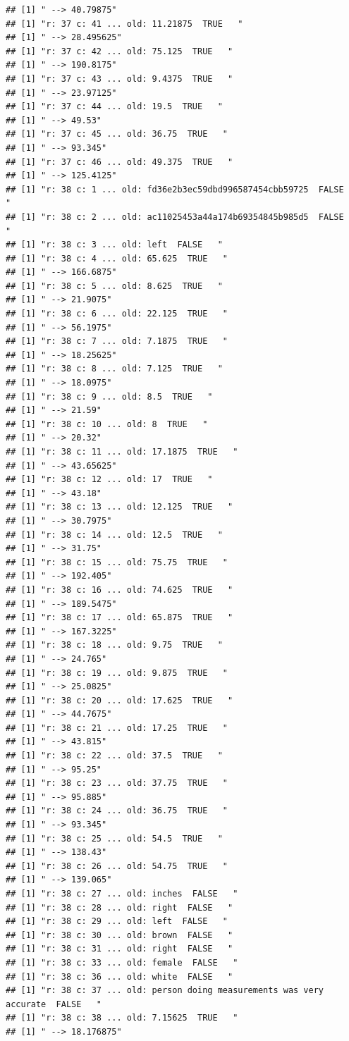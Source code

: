\documentclass[]{article}
\begin{document}
\begin{verbatim}
## [1] " --> 40.79875"
## [1] "r: 37 c: 41 ... old: 11.21875  TRUE   "
## [1] " --> 28.495625"
## [1] "r: 37 c: 42 ... old: 75.125  TRUE   "
## [1] " --> 190.8175"
## [1] "r: 37 c: 43 ... old: 9.4375  TRUE   "
## [1] " --> 23.97125"
## [1] "r: 37 c: 44 ... old: 19.5  TRUE   "
## [1] " --> 49.53"
## [1] "r: 37 c: 45 ... old: 36.75  TRUE   "
## [1] " --> 93.345"
## [1] "r: 37 c: 46 ... old: 49.375  TRUE   "
## [1] " --> 125.4125"
## [1] "r: 38 c: 1 ... old: fd36e2b3ec59dbd996587454cbb59725  FALSE   "
## [1] "r: 38 c: 2 ... old: ac11025453a44a174b69354845b985d5  FALSE   "
## [1] "r: 38 c: 3 ... old: left  FALSE   "
## [1] "r: 38 c: 4 ... old: 65.625  TRUE   "
## [1] " --> 166.6875"
## [1] "r: 38 c: 5 ... old: 8.625  TRUE   "
## [1] " --> 21.9075"
## [1] "r: 38 c: 6 ... old: 22.125  TRUE   "
## [1] " --> 56.1975"
## [1] "r: 38 c: 7 ... old: 7.1875  TRUE   "
## [1] " --> 18.25625"
## [1] "r: 38 c: 8 ... old: 7.125  TRUE   "
## [1] " --> 18.0975"
## [1] "r: 38 c: 9 ... old: 8.5  TRUE   "
## [1] " --> 21.59"
## [1] "r: 38 c: 10 ... old: 8  TRUE   "
## [1] " --> 20.32"
## [1] "r: 38 c: 11 ... old: 17.1875  TRUE   "
## [1] " --> 43.65625"
## [1] "r: 38 c: 12 ... old: 17  TRUE   "
## [1] " --> 43.18"
## [1] "r: 38 c: 13 ... old: 12.125  TRUE   "
## [1] " --> 30.7975"
## [1] "r: 38 c: 14 ... old: 12.5  TRUE   "
## [1] " --> 31.75"
## [1] "r: 38 c: 15 ... old: 75.75  TRUE   "
## [1] " --> 192.405"
## [1] "r: 38 c: 16 ... old: 74.625  TRUE   "
## [1] " --> 189.5475"
## [1] "r: 38 c: 17 ... old: 65.875  TRUE   "
## [1] " --> 167.3225"
## [1] "r: 38 c: 18 ... old: 9.75  TRUE   "
## [1] " --> 24.765"
## [1] "r: 38 c: 19 ... old: 9.875  TRUE   "
## [1] " --> 25.0825"
## [1] "r: 38 c: 20 ... old: 17.625  TRUE   "
## [1] " --> 44.7675"
## [1] "r: 38 c: 21 ... old: 17.25  TRUE   "
## [1] " --> 43.815"
## [1] "r: 38 c: 22 ... old: 37.5  TRUE   "
## [1] " --> 95.25"
## [1] "r: 38 c: 23 ... old: 37.75  TRUE   "
## [1] " --> 95.885"
## [1] "r: 38 c: 24 ... old: 36.75  TRUE   "
## [1] " --> 93.345"
## [1] "r: 38 c: 25 ... old: 54.5  TRUE   "
## [1] " --> 138.43"
## [1] "r: 38 c: 26 ... old: 54.75  TRUE   "
## [1] " --> 139.065"
## [1] "r: 38 c: 27 ... old: inches  FALSE   "
## [1] "r: 38 c: 28 ... old: right  FALSE   "
## [1] "r: 38 c: 29 ... old: left  FALSE   "
## [1] "r: 38 c: 30 ... old: brown  FALSE   "
## [1] "r: 38 c: 31 ... old: right  FALSE   "
## [1] "r: 38 c: 33 ... old: female  FALSE   "
## [1] "r: 38 c: 36 ... old: white  FALSE   "
## [1] "r: 38 c: 37 ... old: person doing measurements was very accurate  FALSE   "
## [1] "r: 38 c: 38 ... old: 7.15625  TRUE   "
## [1] " --> 18.176875"

\end{verbatim}
\end{document}
